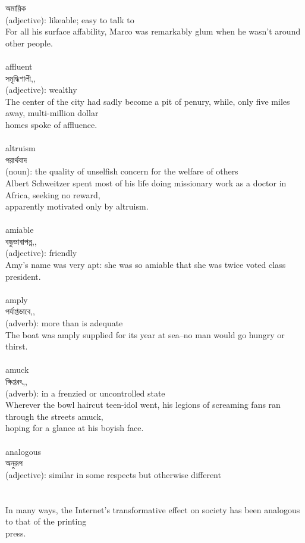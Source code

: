 \documentclass{article}
\begin{document}
{অমায়িক}\\
{(adjective): likeable; easy to talk to\\For all his surface affability, Marco was remarkably glum when he wasn't around other people.\\}\\
{affluent}\\
{সমৃদ্ধিশালী,,}\\
{(adjective): wealthy\\The center of the city had sadly become a pit of penury, while, only five miles away, multi-million dollar\\homes spoke of affluence.\\}\\
{altruism}\\
{পরার্থবাদ}\\
{(noun): the quality of unselfish concern for the welfare of others\\Albert Schweitzer spent most of his life doing missionary work as a doctor in Africa, seeking no reward,\\apparently motivated only by altruism.\\}\\
{amiable}\\
{বন্ধুভাবাপন্ন,,}\\
{(adjective): friendly\\Amy's name was very apt: she was so amiable that she was twice voted class president.\\}\\
{amply}\\
{পর্যাপ্তভাবে,,}\\
{(adverb): more than is adequate\\The boat was amply supplied for its year at sea--no man would go hungry or thirst.\\}\\
{amuck}\\
{ক্ষিপ্তবৎ,,}\\
{(adverb): in a frenzied or uncontrolled state\\Wherever the bowl haircut teen-idol went, his legions of screaming fans ran through the streets amuck,\\hoping for a glance at his boyish face.\\}\\
{analogous}\\
{অনুরূপ}\\
{(adjective): similar in some respects but otherwise different\\\\                                                                              \\In many ways, the Internet's transformative effect on society has been analogous to that of the printing\\press.\\}\\
\end{document}

